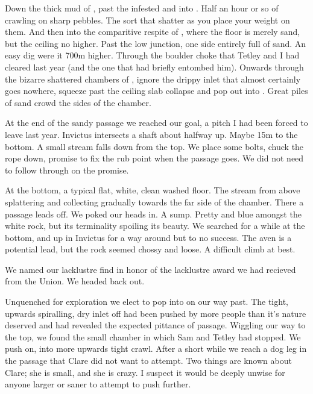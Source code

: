 Down the thick mud of , past the infested  and into . Half an hour or so of crawling on sharp pebbles. The sort that shatter as you place your weight on them. And then into the comparitive respite of , where the floor is merely sand, but the ceiling no higher. Past the low junction, one side entirely full of sand. An easy dig were it 700m higher. Through the boulder choke that Tetley and I had cleared last year (and the one that had briefly entombed him). Onwards through the bizarre shattered chambers of , ignore the drippy inlet that almost certainly goes nowhere, squeeze past the ceiling slab collapse and pop out into . Great piles of sand crowd the sides of the chamber.

At the end of the sandy passage we reached our goal, a pitch I had been forced to leave last year. Invictus intersects a shaft about halfway up. Maybe 15m to the bottom. A small stream falls down from the top. We place some bolts, chuck the rope down, promise to fix the rub point when the passage goes. We did not need to follow through on the promise. 

At the bottom, a typical flat, white, clean washed floor. The stream from above splattering and collecting gradually towards the far side of the chamber. There a passage leads off. We poked our heads in. A sump. Pretty and blue amongst the white rock, but its terminality spoiling its beauty. We searched for a while at the bottom, and up in Invictus for a way around but to no success. The aven is a potential lead, but the rock seemed chossy and loose. A difficult climb at best.

We named our lacklustre find  in honor of the lacklustre award we had recieved from the Union. We headed back out. 

Unquenched for exploration we elect to pop into  on our way past. The tight, upwards spiralling, dry inlet off  had been pushed by more people than it's nature deserved and had revealed the expected pittance of passage. Wiggling our way to the top, we found the small chamber in which Sam and Tetley had stopped. We push on, into more upwards tight crawl. After a short while we reach a dog leg in the passage that Clare did not want to attempt. Two things are known about Clare; she is small, and she is crazy. I suspect it would be deeply unwise for anyone larger or saner to attempt to push further. 

